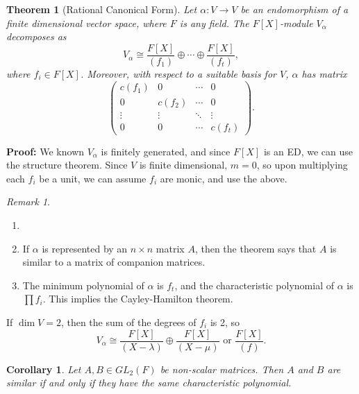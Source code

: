 \documentclass[12pt]{article}
\newtheorem{theorem}{Theorem}[section]
\newtheorem{corollary}{Corollary}[section]
\theoremstyle{definition}
\theoremstyle{remark}
\newtheorem*{remark}{Remark}
\begin{document}
\begin{theorem}[Rational Canonical Form]
	Let $\alpha : V \to V$ be an endomorphism of a finite dimensional vector space, where $F$ is any field. The $F[X]$-module $V_{\alpha}$ decomposes as
	\[
		V_{\alpha} \cong \frac{F[X]}{(f_1)} \oplus \cdots \oplus \frac{F[X]}{(f_t)}
	,\]
	where $f_i \in F[X]$. Moreover, with respect to a suitable basis for $V$, $\alpha$ has matrix
	\[
	\begin{pmatrix}
		c(f_1) & 0 & \cdots & 0 \\
		0 & c(f_2) & \cdots & 0 \\
		\vdots & \vdots & \ddots & \vdots \\
		0 & 0 & \cdots & c(f_t)
	\end{pmatrix}
	.\]
\end{theorem}

\begin{adjustbox}{minipage = \columnwidth - 25.5pt, margin=1em, frame=1pt, margin=0em}
	\textbf{Proof:} We known $V_{\alpha}$ is finitely generated, and since $F[X]$ is an ED, we can use the structure theorem. Since $V$ is finite dimensional, $m = 0$, so upon multiplying each $f_i$ be a unit, we can assume $f_i$ are monic, and use the above.
\end{adjustbox}

\begin{remark}
	\begin{enumerate}[label = (\roman*)]
		\item[]
		\item If $\alpha$ is represented by an $n \times n$ matrix $A$, then the theorem says that $A$ is similar to a matrix of companion matrices.
		\item The minimum polynomial of $\alpha$ is $f_t$, and the characteristic polynomial of $\alpha$ is $\prod f_i$. This implies the Cayley-Hamilton theorem.
	\end{enumerate}
\end{remark}

If $\dim V = 2$, then the sum of the degrees of $f_i$ is 2, so
\[
	V_{\alpha} \cong \frac{F[X]}{(X - \lambda)} \oplus \frac{F[X]}{(X - \mu)} \text{ or } \frac{F[X]}{(f)}
.\]

\begin{corollary}
	Let $A, B \in GL_2(F)$ be non-scalar matrices. Then $A$ and $B$ are similar if and only if they have the same characteristic polynomial.
\end{corollary}
\end{document}

